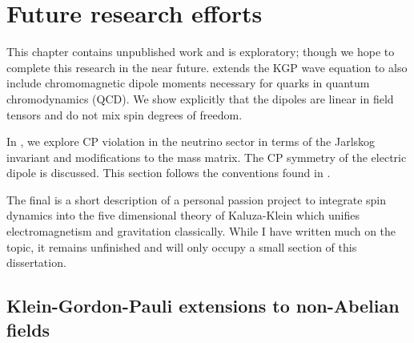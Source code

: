\chapter{Future research efforts}
\label{chap:future}

This chapter contains unpublished work and is exploratory; though we hope to complete this research in the near future.  extends the KGP wave equation to also include chromomagnetic dipole moments necessary for quarks in quantum chromodynamics (QCD). We show explicitly that the dipoles are linear in field tensors and do not mix spin degrees of freedom.

In , we explore CP violation in the neutrino sector in terms of the Jarlskog invariant and modifications to the mass matrix. The CP symmetry of the electric dipole is discussed. This section follows the conventions found in .

The final  is a short description of a personal passion project to integrate spin dynamics into the five dimensional theory of Kaluza-Klein which unifies electromagnetism and gravitation classically. While I have written much on the topic, it remains unfinished and will only occupy a small section of this dissertation.

\section{Klein-Gordon-Pauli extensions to non-Abelian fields}
\label{sec:quarks}

